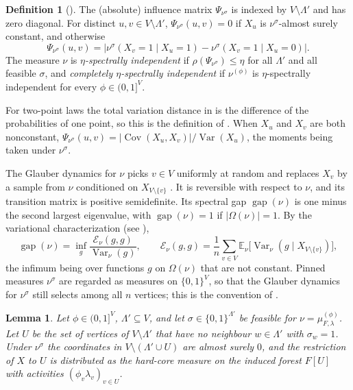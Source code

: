\documentclass{amsart}
\numberwithin{equation}{section}
\numberwithin{table}{section}
\newtheorem{lemma}[theorem]{Lemma}
\theoremstyle{definition}
\newtheorem{definition}[theorem]{Definition}
\theoremstyle{remark}
\newcommand{\E}{\mathbb{E}}
\newcommand{\Var}{\operatorname{Var}}
\newcommand{\Cov}{\operatorname{Cov}}
\newcommand{\gap}{\operatorname{gap}}
\begin{document}
\begin{definition}[{\cite[Definitions~1.5 and 1.8]{CFYZ}}]\label{def:SI}
The (absolute) influence matrix $\Psi_{\nu^\sigma}$ is indexed by $V\setminus\Lambda'$ and has zero diagonal. For distinct $u,v\in V\setminus\Lambda'$, $\Psi_{\nu^\sigma}(u,v)=0$ if $X_u$ is $\nu^\sigma$-almost surely constant, and otherwise
\[
\Psi_{\nu^\sigma}(u,v)=\bigl|\nu^\sigma(X_v=1\mid X_u=1)-\nu^\sigma(X_v=1\mid X_u=0)\bigr|.
\]
The measure $\nu$ is \emph{$\eta$-spectrally independent} if $\rho(\Psi_{\nu^\sigma})\le\eta$ for all $\Lambda'$ and all feasible $\sigma$, and \emph{completely $\eta$-spectrally independent} if $\nu^{(\phi)}$ is $\eta$-spectrally independent for every $\phi\in(0,1]^V$.
\end{definition}

For two-point laws the total variation distance in \cite[Definition~1.5]{CFYZ} is the difference of the probabilities of one point, so this is the definition of \cite{CFYZ}. When $X_u$ and $X_v$ are both nonconstant, $\Psi_{\nu^\sigma}(u,v)=|\Cov(X_u,X_v)|/\Var(X_u)$, the moments being taken under $\nu^\sigma$.

The Glauber dynamics for $\nu$ picks $v\in V$ uniformly at random and replaces $X_v$ by a sample from $\nu$ conditioned on $X_{V\setminus\{v\}}$ \cite[Section~1]{CFYZ}. It is reversible with respect to $\nu$, and its transition matrix is positive semidefinite. Its spectral gap $\gap(\nu)$ is one minus the second largest eigenvalue, with $\gap(\nu)=1$ if $|\Omega(\nu)|=1$. By the variational characterization (see \cite[Chapter~13]{LP}),
\begin{equation}\label{eq:variational}
\gap(\nu)=\inf_{g}\frac{\mathcal E_\nu(g,g)}{\Var_\nu(g)},\qquad \mathcal E_\nu(g,g)=\frac1n\sum_{v\in V}\E_\nu\bigl[\Var_\nu(g\mid X_{V\setminus\{v\}})\bigr],
\end{equation}
the infimum being over functions $g$ on $\Omega(\nu)$ that are not constant. Pinned measures $\nu^\sigma$ are regarded as measures on $\{0,1\}^V$, so that the Glauber dynamics for $\nu^\sigma$ still selects among all $n$ vertices; this is the convention of \cite[(4)]{CFYZ}.

\begin{lemma}\label{lem:pinning}
Let $\phi\in(0,1]^V$, $\Lambda'\subseteq V$, and let $\sigma\in\{0,1\}^{\Lambda'}$ be feasible for $\nu=\mu_{F,\lambda}^{(\phi)}$. Let $U$ be the set of vertices of $V\setminus\Lambda'$ that have no neighbour $w\in\Lambda'$ with $\sigma_w=1$. Under $\nu^\sigma$ the coordinates in $V\setminus(\Lambda'\cup U)$ are almost surely $0$, and the restriction of $X$ to $U$ is distributed as the hard-core measure on the induced forest $F[U]$ with activities $(\phi_v\lambda_v)_{v\in U}$.
\end{lemma}
\end{document}
